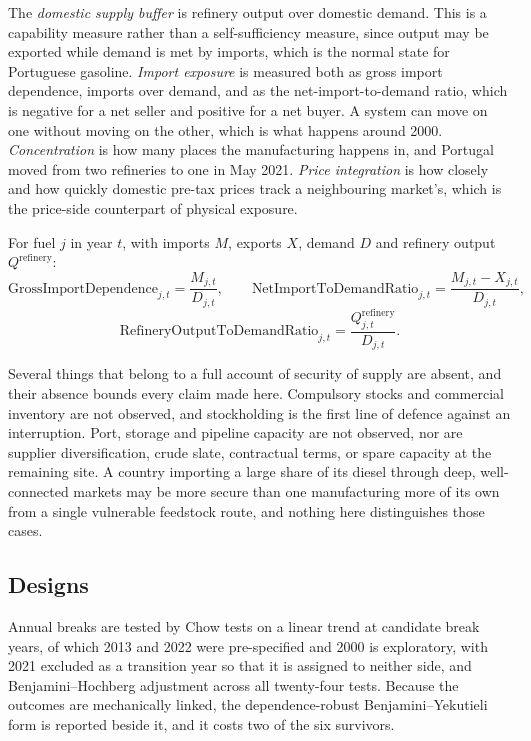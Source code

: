 \documentclass[11pt,a4paper]{article}
\begin{document}
The \emph{domestic supply buffer} is refinery output over domestic demand. This is a capability
measure rather than a self-sufficiency measure, since output may be exported while demand is
met by imports, which is the normal state for Portuguese gasoline. \emph{Import exposure} is measured
both as gross import dependence, imports over demand, and as the net-import-to-demand ratio,
which is negative for a net seller and positive for a net buyer. A system can move on one without
moving on the other, which is what happens around 2000. \emph{Concentration} is how many places
the manufacturing happens in, and Portugal moved from two refineries to one in May 2021.
\emph{Price integration} is how closely and how quickly domestic pre-tax prices track a
neighbouring market's, which is the price-side counterpart of physical exposure.

For fuel $j$ in year $t$, with imports $M$, exports $X$, demand $D$ and refinery output
$Q^{\text{refinery}}$:
\[
\text{GrossImportDependence}_{j,t}=\frac{M_{j,t}}{D_{j,t}},
\qquad
\text{NetImportToDemandRatio}_{j,t}=\frac{M_{j,t}-X_{j,t}}{D_{j,t}},
\]
\[
\text{RefineryOutputToDemandRatio}_{j,t}=\frac{Q^{\text{refinery}}_{j,t}}{D_{j,t}}.
\]

Several things that belong to a full account of security of supply are absent, and their absence
bounds every claim made here. Compulsory stocks and commercial inventory are not observed, and
stockholding is the first line of defence against an interruption. Port, storage and pipeline
capacity are not observed, nor are supplier diversification, crude slate, contractual terms, or
spare capacity at the remaining site. A country importing a large share of its diesel through
deep, well-connected markets may be more secure than one manufacturing more of its own from a
single vulnerable feedstock route, and nothing here distinguishes those cases.

\subsection{Designs}

Annual breaks are tested by Chow tests \citep{chow1960tests} on a linear trend at candidate
break years, of which 2013 and
2022 were pre-specified and 2000 is exploratory, with 2021 excluded as a transition year so that
it is assigned to neither side, and Benjamini--Hochberg adjustment \citep{benjamini1995controlling} across all twenty-four
tests. Because the outcomes are mechanically linked, the dependence-robust Benjamini--Yekutieli
form \citep{benjamini2001control} is reported beside it, and it costs two of the six survivors.
\end{document}
